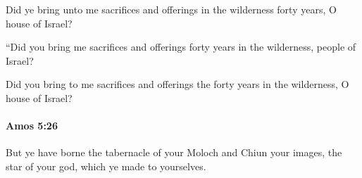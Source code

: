 			\begin{versebox}
					\item[BHS] 
					\item[LXX] 
					\item[ASV] Did ye bring unto me sacrifices and offerings in the wilderness forty years, O house of Israel?
					\item[NIV] “Did you bring me sacrifices and offerings forty years in the wilderness, people of Israel?
					\item[NRSV] Did you bring to me sacrifices and offerings the forty years in the wilderness, O house of Israel?
			\end{versebox}

		\paragraph{Amos 5:26} %
			\label{AMOS-5-26}

			But ye have borne the tabernacle of your Moloch and Chiun your images, the star of your god, which ye made to yourselves.

